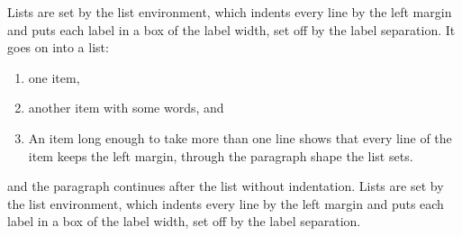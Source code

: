 \documentclass{article}
\begin{document}
Lists are set by the list environment, which indents every line by the left margin and puts each label in a box of the label width, set off by the label separation. It goes on into a list:
\begin{enumerate}
\item one item,
\item another item with some words, and
\item An item long enough to take more than one line shows that every line of the item keeps the left margin, through the paragraph shape the list sets.
\end{enumerate}
and the paragraph continues after the list without indentation. Lists are set by the list environment, which indents every line by the left margin and puts each label in a box of the label width, set off by the label separation.
\end{document}

